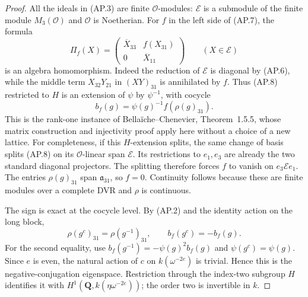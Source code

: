 \documentclass[11pt,a4paper]{article}
\theoremstyle{definition}
\begin{document}
\begin{proof}
All the ideals in (AP.3) are finite $\mathcal O$-modules:
$\mathcal E$ is a submodule of the finite module
$M_3(\mathcal O)$ and $\mathcal O$ is Noetherian.
For $f$ in the left side of (AP.7), the formula
\[
 \Pi_f(X)=
 \begin{pmatrix}
  \overline X_{33}&f(X_{31})\\0&\overline X_{11}
 \end{pmatrix}\qquad(X\in\mathcal E)                       \tag{AP.8}
\]
is an algebra homomorphism.  Indeed the reduction of
$\mathcal E$ is diagonal by (AP.6), while the middle term
$X_{32}Y_{21}$ in $(XY)_{31}$ is annihilated by $f$.
Thus (AP.8) restricted to $H$ is an extension of $\psi$
by $\psi^{-1}$, with cocycle
\[
             b_f(g)=\psi(g)^{-1}f(\rho(g)_{31}).           \tag{AP.9}
\]
This is the rank-one instance of Bella\"iche--Chenevier,
Theorem~1.5.5, whose matrix construction and injectivity
proof apply here without a choice of a new lattice.
For completeness, if this $H$-extension splits, the same
change of basis splits (AP.8) on its $\mathcal O$-linear
span $\mathcal E$.  Its restrictions to $e_1,e_3$ are
already the two standard diagonal projectors.  The splitting
therefore forces $f$ to vanish on $e_3\mathcal E e_1$.
The entries $\rho(g)_{31}$ span $\mathfrak a_{31}$, so
$f=0$.  Continuity follows because these are finite modules
over a complete DVR and $\rho$ is continuous.

The sign is exact at the cocycle level.  By (AP.2) and the
identity action on the long block,
\[
 \rho(g^c)_{31}=\rho(g^{-1})_{31},\qquad
 b_f(g^c)=-b_f(g).                                         \tag{AP.10}
\]
For the second equality, use
$b_f(g^{-1})=-\psi(g)^2b_f(g)$ and
$\psi(g^c)=\psi(g)$.  Since $e$ is even, the natural action
of $c$ on $k(\omega^{-2e})$ is trivial.  Hence this is the
negative-conjugation eigenspace.  Restriction through the
index-two subgroup $H$ identifies it with
$H^1(\mathbf Q,k(\eta\omega^{-2e}))$; the order two is
invertible in $k$.


\end{proof}
\end{document}
